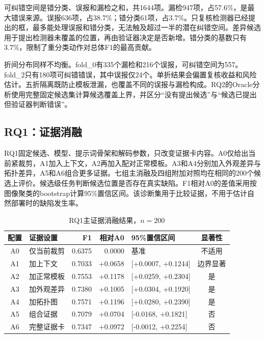 可纠错空间是错分类、误报和漏检之和，共1644项。漏检947项，占57.6\%，是最大错误来源。误报636项，占38.7\%；错分类61项，占3.7\%。只复核检测器已经提出的框，最多能处理误报和错分类，无法触及超过一半的潜在纠错空间。差异候选用于提出检测器未覆盖的位置，再由验证器决定是否新增。错分类的基数只有3.7\%，限制了重分类动作对总体F1的最高贡献。

折间分布同样不均衡。fold\_0有335个漏检和216个误报，可纠错空间为557。fold\_2只有180项可纠错错误，其中误报仅24个。单折结果会偏置复核收益和风险估计。五折隔离既防止模板泄漏，也覆盖不同的误报与漏检构成。RQ2的Oracle分析使用完整固定候选集计算候选覆盖上界，并区分“没有提出候选”与“候选已提出但验证器判断错误”。

\subsection{RQ1：证据消融}
\label{subsec:rq1}

RQ1固定候选、模型、提示词骨架和解码参数，只改变证据卡内容。A0仅给出当前紧裁剪，A1加入上下文，A2再加入配对正常模板。A3和A4分别加入外观差异与拓扑差异，A5和A6组合更多证据。七组主消融及四组附加对照均在相同的200个候选上评价。候选级任务判断候选位置是否存在真实缺陷。F1相对A0的差值采用按图像聚类的bootstrap计算95\%置信区间。该诊断集用于比较证据，不用于估计自然部署时的缺陷发生率。

\begin{table}[t]
  \centering
  \caption{RQ1主证据消融结果，$n=200$}
  \label{tab:rq1_main}
  \setlength{\tabcolsep}{6pt}
  \begin{tabular}{clrrlc}
    \hline
    配置 & 证据设置 & F1 & 相对A0 & 95\%置信区间 & 显著性 \\
    \hline
    A0 & 仅当前裁剪 & 0.6375 & 0.0000 & 基准 & 不适用 \\
    A1 & 加上下文 & 0.7033 & +0.0658 & [+0.0007, +0.1244] & 边界显著 \\
    A2 & 加正常模板 & 0.7553 & +0.1178 & [+0.0259, +0.2304] & 是 \\
    A3 & 加外观差异 & 0.7380 & +0.1005 & [+0.0304, +0.1920] & 是 \\
    A4 & 加拓扑图 & 0.7571 & +0.1196 & [+0.0280, +0.2390] & 是 \\
    A5 & 组合证据 & 0.7079 & +0.0704 & [-0.0168, +0.1821] & 否 \\
    A6 & 完整证据卡 & 0.7347 & +0.0972 & [-0.0012, +0.2254] & 否 \\
    \hline
  \end{tabular}
\end{table}

